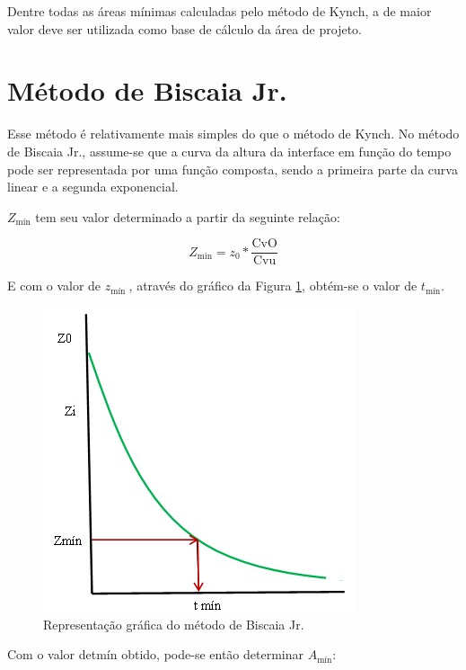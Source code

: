 Dentre todas as áreas mínimas calculadas pelo método de Kynch, a de maior valor deve ser utilizada como base de cálculo da área de projeto.


\section{Método de Biscaia Jr.}

Esse método é relativamente mais simples do que o método de Kynch. No método de Biscaia Jr., assume-se que a curva da altura da interface em função do tempo pode ser representada por uma função composta, sendo a primeira parte da curva linear e a segunda exponencial. 

$ Z_{\text{mín}} $ tem seu valor determinado a partir da seguinte relação:

\begin{equation}\label{key}
Z_{\min }=z_{0} * \frac{\mathrm{CvO}}{\mathrm{Cvu}}
\end{equation}

E com o valor de $ z_{\text{mín }}$, através do gráfico da Figura \ref{tabqua1}, obtém-se o valor de $ t_{\text{mín}} $.

\begin{figure}[H]
	\begin{center}
		\includegraphics[scale=.5,trim={0 0 0 0}]{figuras/ladeq/sedi/graphBiscaia}
		\caption{Representação gráfica do método de Biscaia Jr.}
		\label{tabqua1}
	\end{center}
\end{figure}


Com o valor detmín obtido, pode-se então determinar $ A_{\text{mín}} $:

